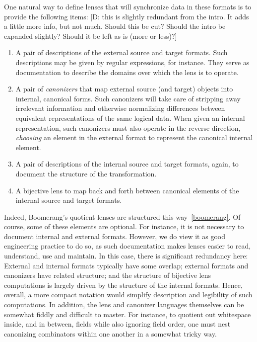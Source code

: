 \documentclass[acmsmall,review,anonymous]{acmart}\settopmatter{printfolios=true,printccs=false,printacmref=false}
\newcommand{\FINISH}[3]{\ifdraft\textcolor{#1}{[#2: #3]}\fi}
\newcommand{\dpw}[1]{\FINISH{dkblue}{D}{#1}} %
\begin{document}
One natural way to define lenses that will synchronize data in these formats
is to provide the following items: \dpw{this is slightly redundant from the intro.  It
adds a little more info, but not much.  Should this be cut?  Should the intro be expanded
slightly?  Should it be left as is (more or less)?}

\begin{enumerate}
\item A pair of descriptions of the external source and target formats.
Such descriptions may be given by regular expressions, for instance.
They serve as documentation to describe the domains over which the lens
is to operate.
\item A pair of \emph{canonizers} that map external source (and target)
objects into internal, canonical forms.  Such canonizers will take
care of stripping away irrelevant information and otherwise normalizing
differences between equivalent representations of the same logical data.
When given an internal representation, such canonizers must also operate
in the reverse direction, \emph{choosing} an element in the external format
to represent the canonical internal element.
\item A pair of descriptions of the internal source and
target formats, again, to document the structure of the transformation.
\item A bijective lens to map back and forth between canonical elements
of the internal source and target formats.
\end{enumerate}

\noindent
Indeed, Boomerang's quotient lenses are structured this way~\ref{boomerang}.
Of course, some of these elements are optional.  For instance, it is
not necessary to document internal and external formats.  However, we do
view it as good engineering practice to do so, as such documentation makes
lenses easier to read, understand, use and maintain.  In this case, there is
significant redundancy here:  External and internal formats
typically have some overlap; external formats and canonizers have related
structure; and the structure of bijective lens computations is largely driven
by the structure of the internal formats.  Hence, overall, a more compact
notation would simplify description and legibility of such computations.
In addition,
the lens and canonizer languages themselves can be somewhat fiddly and
difficult to
master.  For instance, to quotient out whitespace inside, and in between,
fields while also ignoring field order, one must nest canonizing combinators
within one another in a somewhat tricky way.  
\end{document}
